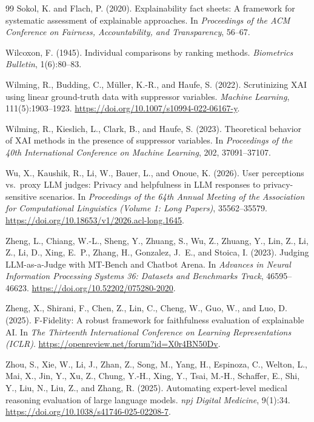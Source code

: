 \documentclass[10pt]{article}
\begin{document}
\begin{thebibliography}{99}
Sokol, K. and Flach, P. (2020).
Explainability fact sheets: A framework for systematic assessment of
explainable approaches.
In \emph{Proceedings of the ACM Conference on Fairness, Accountability,
and Transparency}, 56--67.

Wilcoxon, F. (1945).
Individual comparisons by ranking methods.
\emph{Biometrics Bulletin}, 1(6):80--83.

Wilming, R., Budding, C., M\"{u}ller, K.-R., and Haufe, S. (2022).
Scrutinizing {XAI} using linear ground-truth data with suppressor variables.
\emph{Machine Learning}, 111(5):1903--1923.
\url{https://doi.org/10.1007/s10994-022-06167-y}.

Wilming, R., Kieslich, L., Clark, B., and Haufe, S. (2023).
Theoretical behavior of {XAI} methods in the presence of suppressor
variables.
In \emph{Proceedings of the 40th International Conference on Machine
Learning}, 202, 37091--37107.

Wu, X., Kaushik, R., Li, W., Bauer, L., and Onoue, K. (2026).
User perceptions vs.\ proxy LLM judges: Privacy and helpfulness in LLM
responses to privacy-sensitive scenarios.
In \emph{Proceedings of the 64th Annual Meeting of the Association for
Computational Linguistics (Volume 1: Long Papers)}, 35562--35579.
\url{https://doi.org/10.18653/v1/2026.acl-long.1645}.

Zheng, L., Chiang, W.-L., Sheng, Y., Zhuang, S., Wu, Z., Zhuang, Y.,
Lin, Z., Li, Z., Li, D., Xing, E.~P., Zhang, H., Gonzalez, J.~E., and
Stoica, I. (2023).
Judging LLM-as-a-Judge with MT-Bench and Chatbot Arena.
In \emph{Advances in Neural Information Processing Systems 36: Datasets
and Benchmarks Track}, 46595--46623.
\url{https://doi.org/10.52202/075280-2020}.

Zheng, X., Shirani, F., Chen, Z., Lin, C., Cheng, W., Guo, W., and
Luo, D. (2025).
F-Fidelity: A robust framework for faithfulness evaluation of explainable AI.
In \emph{The Thirteenth International Conference on Learning
Representations (ICLR)}.
\url{https://openreview.net/forum?id=X0r4BN50Dv}.

Zhou, S., Xie, W., Li, J., Zhan, Z., Song, M., Yang, H., Espinoza, C.,
Welton, L., Mai, X., Jin, Y., Xu, Z., Chung, Y.-H., Xing, Y., Tsai, M.-H.,
Schaffer, E., Shi, Y., Liu, N., Liu, Z., and Zhang, R. (2025).
Automating expert-level medical reasoning evaluation of large language
models.
\emph{npj Digital Medicine}, 9(1):34.
\url{https://doi.org/10.1038/s41746-025-02208-7}.

\end{thebibliography}
\end{document}
